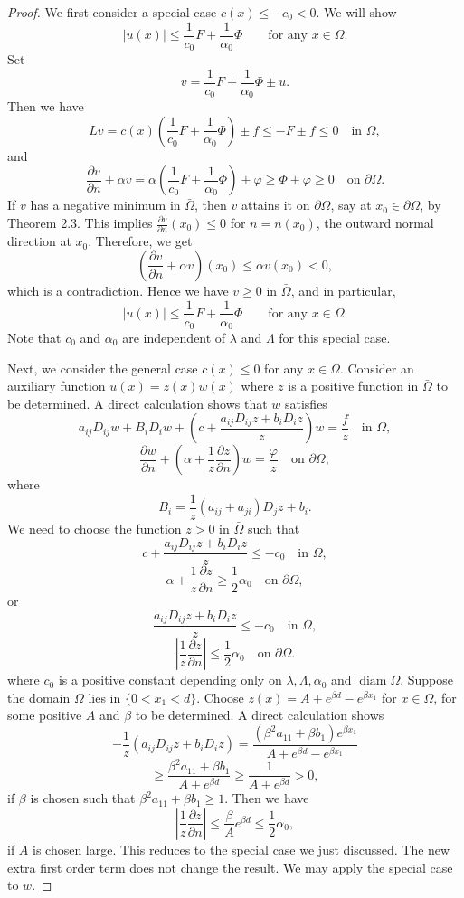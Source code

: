 \begin{proof}
\sketch
We first consider a special case $c(x) \leq -c_0 < 0$. We will show
$$
|u(x)| \leq \frac{1}{c_0} F + \frac{1}{\alpha_0} \Phi \qquad \text{for any } x \in \Omega.
$$
Set
$$
v = \frac{1}{c_0} F + \frac{1}{\alpha_0} \Phi \pm u.
$$
Then we have
$$
Lv = c(x)\left(\frac{1}{c_0}F + \frac{1}{\alpha_0}\Phi\right) \pm f \leq -F \pm f \leq 0 \quad \text{in } \Omega,
$$
and
$$
\frac{\partial v}{\partial n} + \alpha v = \alpha \left(\frac{1}{c_0}F + \frac{1}{\alpha_0}\Phi\right) \pm \varphi \geq \Phi \pm \varphi \geq 0 \quad \text{on } \partial \Omega.
$$
If $v$ has a negative minimum in $\bar{\Omega}$, then $v$ attains it on $\partial \Omega$, say at $x_0 \in \partial \Omega$, by Theorem 2.3. This implies $\frac{\partial v}{\partial n}(x_0) \leq 0$ for $n = n(x_0)$, the outward normal direction at $x_0$. Therefore, we get
$$
\left(\frac{\partial v}{\partial n} + \alpha v\right)(x_0) \leq \alpha v(x_0) < 0,
$$
which is a contradiction. Hence we have $v \geq 0$ in $\bar{\Omega}$, and in particular,
$$
|u(x)| \leq \frac{1}{c_0} F + \frac{1}{\alpha_0} \Phi \qquad \text{for any } x \in \Omega.
$$
Note that $c_0$ and $\alpha_0$ are independent of $\lambda$ and $\Lambda$ for this special case.

Next, we consider the general case $c(x) \leq 0$ for any $x \in \Omega$. Consider an auxiliary function $u(x) = z(x)w(x)$ where $z$ is a positive function in $\bar{\Omega}$ to be determined. A direct calculation shows that $w$ satisfies
$$
a_{ij}D_{ij}w + B_iD_iw + \left(c + \frac{a_{ij}D_{ij}z + b_iD_iz}{z}\right) w = \frac{f}{z} \quad \text{in } \Omega,
$$
$$
\frac{\partial w}{\partial n} + \left(\alpha + \frac{1}{z}\frac{\partial z}{\partial n}\right) w = \frac{\varphi}{z} \quad \text{on } \partial \Omega,
$$
where
$$
B_i = \frac{1}{z}(a_{ij} + a_{ji})D_jz + b_i.
$$
We need to choose the function $z>0$ in $\bar\Omega$ such that
\[
c+\frac{a_{ij}D_{ij}z+b_iD_iz}{z}\le -c_0 \quad \text{in } \Omega,
\]
\[
\alpha+\frac{1}{z}\frac{\partial z}{\partial n}\ge \frac{1}{2}\alpha_0 \quad \text{on } \partial\Omega,
\]
or
\[
\frac{a_{ij}D_{ij}z+b_iD_iz}{z}\le -c_0 \quad \text{in } \Omega,
\]
\[
\left|\frac{1}{z}\frac{\partial z}{\partial n}\right|\le \frac{1}{2}\alpha_0 \quad \text{on } \partial\Omega.
\]
where $c_0$ is a positive constant depending only on $\lambda,\Lambda,\alpha_0$ and $\operatorname{diam}\Omega$. Suppose the domain $\Omega$ lies in $\{0<x_1<d\}$. Choose $z(x)=A+e^{\beta d}-e^{\beta x_1}$ for $x\in\Omega$, for some positive $A$ and $\beta$ to be determined. A direct calculation shows
\[
-\frac{1}{z}\left(a_{ij}D_{ij}z+b_iD_iz\right)
=\frac{(\beta^2a_{11}+\beta b_1)e^{\beta x_1}}{A+e^{\beta d}-e^{\beta x_1}}
\]
\[
\ge \frac{\beta^2a_{11}+\beta b_1}{A+e^{\beta d}}\ge \frac{1}{A+e^{\beta d}}>0,
\]
if $\beta$ is chosen such that $\beta^2a_{11}+\beta b_1\ge 1$. Then we have
\[
\left|\frac{1}{z}\frac{\partial z}{\partial n}\right|\le \frac{\beta}{A}e^{\beta d}\le \frac{1}{2}\alpha_0,
\]
if $A$ is chosen large. This reduces to the special case we just discussed. The new extra first order term does not change the result. We may apply the special case to $w$.

\end{proof}

